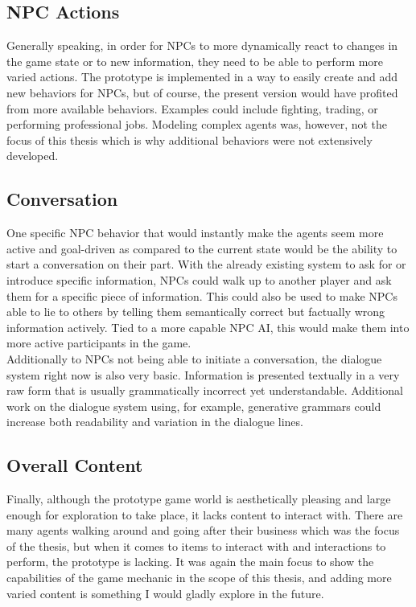 \subsection{NPC Actions}
Generally speaking, in order for NPCs to more dynamically react to changes in the game state or to new information, they need to be able to perform more varied actions. The prototype is implemented in a way to easily create and add new behaviors for NPCs, but of course, the present version would have profited from more available behaviors. Examples could include fighting, trading, or performing professional jobs. Modeling complex agents was, however, not the focus of this thesis which is why additional behaviors were not extensively developed.
\subsection{Conversation}
One specific NPC behavior that would instantly make the agents seem more active and goal-driven as compared to the current state would be the ability to start a conversation on their part. With the already existing system to ask for or introduce specific information, NPCs could walk up to another player and ask them for a specific piece of information. This could also be used to make NPCs able to lie to others by telling them semantically correct but factually wrong information actively. Tied to a more capable NPC AI, this would make them into more active participants in the game.\\
Additionally to NPCs not being able to initiate a conversation, the dialogue system right now is also very basic. Information is presented textually in a very raw form that is usually grammatically incorrect yet understandable. Additional work on the dialogue system using, for example, generative grammars could increase both readability and variation in the dialogue lines.
\subsection{Overall Content}
Finally, although the prototype game world is aesthetically pleasing and large enough for exploration to take place, it lacks content to interact with. There are many agents walking around and going after their business which was the focus of the thesis, but when it comes to items to interact with and interactions to perform, the prototype is lacking. It was again the main focus to show the capabilities of the game mechanic in the scope of this thesis, and adding more varied content is something I would gladly explore in the future.
